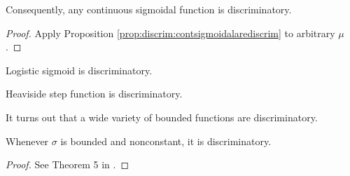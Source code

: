 \begin{corollary}
Consequently, any continuous sigmoidal function is discriminatory.
\end{corollary}
\begin{proof}
Apply Proposition \ref{prop:discrim:contsigmoidalarediscrim} to arbitrary $\mu$.
\end{proof}
\begin{corollary}
Logistic sigmoid is discriminatory.
\end{corollary}
\begin{corollary}
Heaviside step function is discriminatory.
\end{corollary}
It turns out that a wide variety of bounded functions are discriminatory.
\begin{theorem}
Whenever $\sigma$ is bounded and nonconstant, it is discriminatory.
\end{theorem}
\begin{proof}
See Theorem 5 in \cite{hornik_1991_approximation}.
\end{proof}